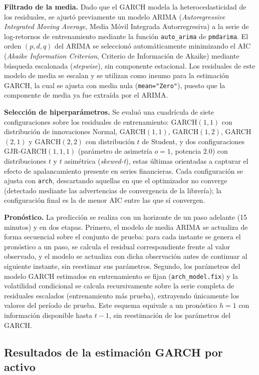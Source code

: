 \documentclass[12pt]{paper}
\begin{document}
\textbf{Filtrado de la media.} Dado que el GARCH modela la heterocedasticidad de los residuales, se ajustó previamente un modelo ARIMA (\textit{Autoregressive Integrated Moving Average}, Media Móvil Integrada Autorregresiva) a la serie de log-retornos de entrenamiento mediante la función \texttt{auto\_arima} de \texttt{pmdarima}. El orden $(p, d, q)$ del ARIMA se seleccionó automáticamente minimizando el AIC (\textit{Akaike Information Criterion}, Criterio de Información de Akaike) mediante búsqueda escalonada (\textit{stepwise}), sin componente estacional. Los residuales de este modelo de media se escalan y se utilizan como insumo para la estimación GARCH, la cual se ajusta con media nula (\texttt{mean="Zero"}), puesto que la componente de media ya fue extraída por el ARIMA.

\textbf{Selección de hiperparámetros.} Se evaluó una cuadrícula de siete configuraciones sobre los residuales de entrenamiento: GARCH$(1,1)$ con distribución de innovaciones Normal, GARCH$(1,1)$, GARCH$(1,2)$, GARCH$(2,1)$ y GARCH$(2,2)$ con distribución $t$ de Student, y dos configuraciones GJR-GARCH$(1,1,1)$ (parámetro de asimetría $o=1$, potencia $2.0$) con distribuciones $t$ y $t$ asimétrica (\textit{skewed-t}), estas últimas orientadas a capturar el efecto de apalancamiento presente en series financieras. Cada configuración se ajusta con \texttt{arch}, descartando aquellas en que el optimizador no converge (detectado mediante las advertencias de convergencia de la librería); la configuración final es la de menor AIC entre las que sí convergen.

\textbf{Pronóstico.} La predicción se realiza con un horizonte de un paso adelante (15 minutos) y en dos etapas. Primero, el modelo de media ARIMA se actualiza de forma secuencial sobre el conjunto de prueba: para cada instante se genera el pronóstico a un paso, se calcula el residual correspondiente frente al valor observado, y el modelo se actualiza con dicha observación antes de continuar al siguiente instante, sin reestimar sus parámetros. Segundo, los parámetros del modelo GARCH estimados en entrenamiento se fijan (\texttt{arch\_model.fix}) y la volatilidad condicional se calcula recursivamente sobre la serie completa de residuales escalados (entrenamiento más prueba), extrayendo únicamente los valores del período de prueba. Este esquema equivale a un pronóstico $h=1$ con información disponible hasta $t-1$, sin reestimación de los parámetros del GARCH.

\subsection{Resultados de la estimación GARCH por activo}
\label{sec:garch-por-activo}
\end{document}
